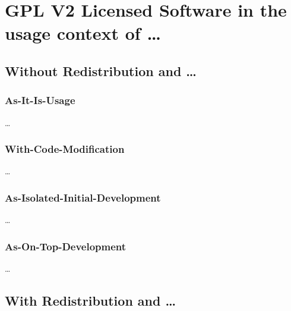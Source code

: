 %
%
%
%
%



\section{GPL V2 Licensed Software in the usage context of \ldots}
\subsection{Without Redistribution and \ldots}
\subsubsection{As-It-Is-Usage}
\ldots
\subsubsection{With-Code-Modification}
\ldots
\subsubsection{As-Isolated-Initial-Development}
\ldots
\subsubsection{As-On-Top-Development}
\ldots

\subsection{With Redistribution and \ldots}

